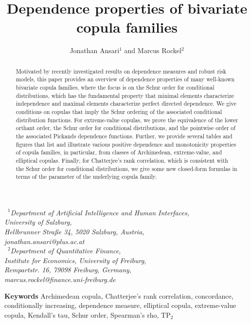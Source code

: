 \documentclass{article}
\author{Jonathan Ansari$^1$ and Marcus Rockel$^{2}$}
\title{Dependence properties of bivariate copula families}
\providecommand{\keywords}[1]{\textbf{Keywords } #1}
\newcommand{\TP}{\mathrm{TP_2}}
\begin{document}
\maketitle
\vspace{-5ex}

\begin{center}
    \small\textit{
		$\phantom{2}^1$Department of Artificial Intelligence and Human Interfaces,\\
		University of Salzburg,\\
		Hellbrunner Straße 34, 5020 Salzburg, Austria,\\
        jonathan.ansari@plus.ac.at \\[2mm]
	}
	\small\textit{
		$\phantom{2}^2$Department of Quantitative Finance,\\
		Institute for Economics, University of Freiburg,\\
		Rempartstr. 16,	79098 Freiburg, Germany,\\
        marcus.rockel@finance.uni-freiburg.de \\[2mm]
	}
\end{center}
\begin{abstract}{
    Motivated by recently investigated results on dependence measures and robust risk models, this paper provides an overview of dependence properties of many well-known bivariate copula families, where the focus is on the Schur order for conditional distributions, which has the fundamental property that minimal elements characterize independence and maximal elements characterize perfect directed dependence.
    We give conditions on copulas that imply the Schur ordering of the associated conditional distribution functions.
    For extreme-value copulas, we prove the equivalence of the lower orthant order, the Schur order for conditional distributions, and the pointwise order of the associated Pickands dependence functions.
    Further, we provide several tables and figures that list and illustrate various positive dependence and monotonicity properties of copula families, in particular, from classes of Archimedean, extreme-value, and elliptical copulas.
    Finally, for Chatterjee's rank correlation, which is consistent with the Schur order for conditional distributions, we give some new closed-form formulas in terms of the parameter of the underlying copula family.
 }
 \end{abstract}
 \vspace{0ex}
 \keywords{Archimedean copula, Chatterjee's rank correlation, concordance, conditionally increasing, dependence measure, elliptical copula, extreme-value copula, Kendall's tau, Schur order, Spearman's rho, \(\TP\)}
  \maketitle
\tableofcontents
\end{document}
